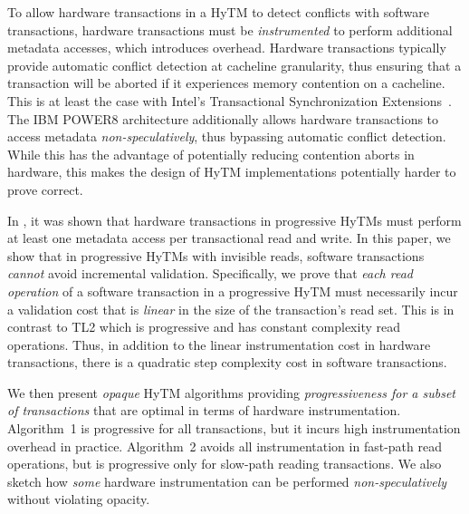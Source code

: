 To allow hardware transactions in a HyTM to detect conflicts with software transactions, hardware transactions must be \emph{instrumented} to perform additional metadata accesses, which introduces overhead.
Hardware transactions typically provide automatic conflict detection at cacheline granularity,
thus ensuring that a transaction will be aborted if it experiences memory contention on a cacheline.
This is at least the case with Intel's Transactional Synchronization Extensions~\cite{haswell}.
The IBM POWER8 architecture additionally allows hardware transactions to access metadata \emph{non-speculatively}, 
thus bypassing automatic conflict detection. While this has the advantage of potentially reducing contention aborts
in hardware, this makes the design of HyTM implementations potentially harder to prove correct.

In \cite{hytm14disc}, it was shown that hardware transactions in progressive HyTMs must perform
at least one metadata access per transactional read and write.
In this paper, we show that in progressive HyTMs with invisible reads, 
software transactions \textit{cannot} avoid incremental validation.
Specifically, we prove that \textit{each read operation} of a software transaction in a progressive HyTM
must necessarily incur a validation cost that is \emph{linear} 
in the size of the transaction's read set. 
This is in contrast to TL2 which is progressive and has constant complexity read operations.
Thus, in addition to the linear instrumentation cost in hardware transactions, there is a quadratic step complexity cost in software transactions.

We then present \emph{opaque} HyTM algorithms providing \emph{progressiveness for a subset of transactions} that are  %
optimal in terms of hardware instrumentation.
Algorithm~1 is progressive for all transactions, but it incurs high instrumentation overhead in practice.
Algorithm~2 avoids all instrumentation in fast-path read operations, but is progressive only for slow-path reading transactions.
We also sketch how \emph{some} hardware instrumentation can be performed \textit{non-speculatively} without violating opacity.

